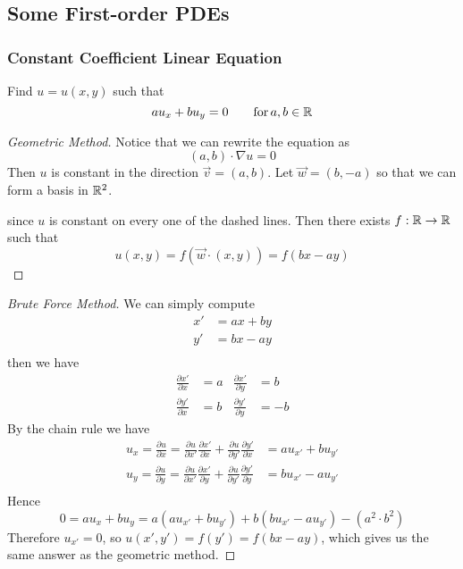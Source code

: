\subsection{Some First-order PDEs}
\subsubsection{Constant Coefficient Linear Equation}
\begin{example}
	Find $u = u(x,y)$ such that
	\[ a u_x + b u_y = 0  \qquad \mathrm{for}\, a,b \in \mathbb R\]

\end{example}
\begin{proof}[Geometric Method]
	Notice that we can rewrite the equation as 
	\[ (a,b) \cdot \nabla u = 0\]
	Then $u$ is constant in the direction $\vec v = (a,b)$. Let $\vec w  = (b,-a)$ so that we can form a basis in $\mathbb R^2$.

	\begin{center}
	\end{center}
	since $u$ is constant on every one of the dashed lines. Then there exists $f : \mathbb R \to \mathbb R$ such that
	\[ u(x,y) = f(\vec w \cdot (x,y)) = f(bx - ay)\]
\end{proof}
\begin{proof}[Brute Force Method]
	We can simply compute
	\begin{align*}
		x' &= ax + by \\
		y' &= bx - ay \\
	\end{align*}
	then we have
	\begin{align*}
		\frac{\partial x'}{\partial x} &= a & \frac{\partial x'}{\partial y} &= b \\
		\frac{\partial y'}{\partial x} &= b & \frac{\partial y'}{\partial y} &= -b 				
	\end{align*}
	By the chain rule we have
	\begin{align*}
		u_x = \frac{\partial u}{\partial x} = \frac{\partial u}{\partial x'} \frac{\partial x'}{\partial x}	+ \frac{\partial u}{\partial y'} \frac{\partial y'}{\partial x} &= au_{x'} + bu_{y'} \\
		u_y = \frac{\partial u}{\partial y} = \frac{\partial u}{\partial x'} \frac{\partial x'}{\partial y}	+ \frac{\partial u}{\partial y'} \frac{\partial y'}{\partial y} &= bu_{x'} - au_{y'} \\
	\end{align*}
	Hence 
	\[ 0 = au_x + bu_y = a(au_{x'} + bu_{y'}) + b(bu_{x'} - au_{y'}) - (a^2 \cdot b^2)\]
	Therefore $u_{x'} = 0$, so $u(x',y') = f(y') = f(bx - ay)$, which gives us the same answer as the geometric method.
	
	
	
\end{proof}
